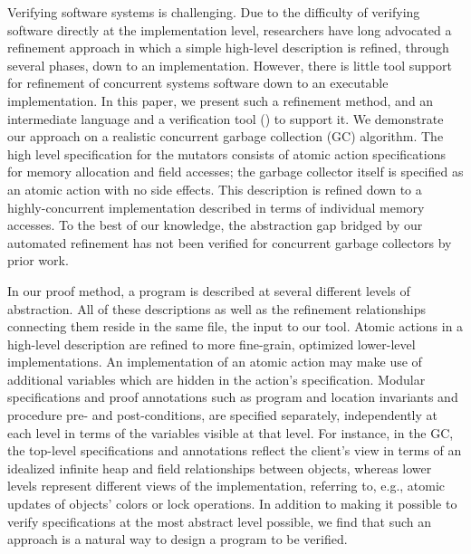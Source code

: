 Verifying software systems is challenging.
Due to the difficulty of verifying software directly at the implementation level,
researchers have long advocated a refinement approach in which a simple high-level description is refined, 
through several phases, down to an implementation.
However, there is little tool support for refinement of concurrent systems software down to an executable implementation.
In this paper, we present such a refinement method, and an intermediate language  and a verification tool (\civl) to support it.
We demonstrate our approach on a realistic concurrent garbage collection (GC) algorithm.
The high level specification for the mutators consists of atomic action specifications for memory allocation and field accesses;
the garbage collector itself is specified as an atomic action with no side effects.
This description is refined down to a highly-concurrent implementation described in terms of individual memory accesses.
To the best of our knowledge, the abstraction gap bridged by our automated refinement has not been verified
for concurrent garbage collectors by prior work.

In our proof method, a program is described at several different levels of abstraction. 
All of these descriptions as well as the refinement relationships connecting them reside in the same \civl file, the input to our tool. 
Atomic actions in a high-level description are refined to more fine-grain, optimized lower-level implementations. 
An implementation of an atomic action may make use of additional variables which are hidden in the action's specification. 
Modular specifications and proof annotations such as program and location invariants and procedure pre- and post-conditions, 
are specified separately, independently at each level in terms of the variables visible at that level. 
For instance, in the GC, the top-level specifications and annotations reflect the client's view 
in terms of an idealized infinite heap and field relationships between objects, 
whereas lower levels represent different views of the implementation, referring to, 
e.g., atomic updates of objects' colors or lock operations.
In addition to making it possible to verify specifications at the most abstract level possible, 
we find that such an approach is a natural way to design a program to be verified.  

